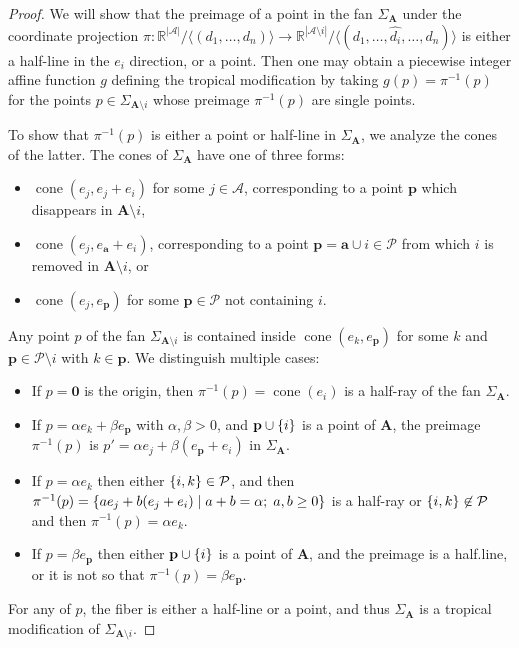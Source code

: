 \documentclass[10pt,a4paper]{amsart}
\newcommand{\R}{\mathbb{R}}    %
\newcommand{\arroid}{\mathbf{A}}
\newcommand{\arroidDeletion}[1]{\arroid\setminus #1}
\DeclareMathOperator{\cone}{cone}
\newcommand{\groundset}{\mathcal{A}}
\newcommand{\pbf}{\mathbf{p}}
\newcommand{\points}{\mathcal{P}}
\DeclarePairedDelimiter{\set}{\lbrace}{\rbrace}        %
\begin{document}
\begin{proof}
    We will show that the preimage of a point in the fan $\Sigma_{\arroid}$ under the coordinate projection $\pi \colon \R^{|\groundset|}/\langle(d_1,\dots, d_n)\rangle \to \R^{|\groundset\setminus i|}/\langle(d_1,\dots, \hat{d_i} ,\dots ,d_n) \rangle$ is either a half-line in the $e_i$ direction, or a point. Then one may obtain a piecewise integer affine function $g$ defining the tropical modification by taking $g(p) = \pi^{-1}(p)$ for the points $p\in \Sigma_{\arroidDeletion{i}}$ whose preimage $\pi^{-1}(p)$ are single points. 

    To show that $\pi^{-1}(p)$ is either a point or half-line in $\Sigma_{\arroid}$, we analyze the cones of the latter. The cones of $\Sigma_{\arroid}$ have one of three forms: 
    \begin{itemize}
        \item $\cone(e_j, e_j+e_i)$ for some $j\in \groundset$, corresponding to a point $\pbf$ which disappears in $\arroidDeletion{i}$,
        \item $\cone(e_j, e_\mathbf{a} + e_i)$, corresponding to a point $\pbf = \mathbf{a}\cup {i} \in \points$ from which $i$ is removed in $\arroidDeletion{i}$, or 
        \item $\cone(e_j, e_\pbf)$ for some $\pbf\in \points$ not containing $i$.
    \end{itemize}

    Any point $p$ of the fan $\Sigma_{\arroidDeletion{i}}$ is contained inside $\cone(e_k,e_\pbf)$ for some $k$ and $\pbf\in \points \setminus i$ with $k \in \pbf$. We distinguish multiple cases:
    \begin{itemize}
        \item If $p=\mathbf{0}$ is the origin, then $\pi^{-1}(p)=\cone(e_i)$ is a half-ray of the fan $\Sigma_{\arroid}$.
        \item If $p = \alpha e_k + \beta e_\pbf$ with $\alpha,\beta >0$, and $\pbf \cup \set{i}$ is a point of $\arroid$, the preimage $\pi^{-1}(p)$ is $p' = \alpha e_j + \beta (e_\pbf+ e_i)$ in $\Sigma_{\arroid}$.
        \item If $p= \alpha e_k$ then either $\set{i,k}\in \points$, and then $\pi^{-1}(p)= \set{a e_j +b (e_j+e_i) \mid a+b=\alpha; \; a,b \geq 0}$ is a half-ray or $\set{i,k} \not\in \points$ and then $\pi^{-1}(p)=\alpha e_k$.
        \item If $p = \beta e_\pbf$ then either $\pbf\cup \set{i}$ is a point of $\arroid$, and the preimage is a half.line, or it is not so that $\pi^{-1}(p)=\beta e_\pbf$.
    \end{itemize}
    For any of $p$, the fiber is either a half-line or a point, and thus $\Sigma_{\arroid}$ is a tropical modification of $\Sigma_{\arroid \setminus i}$.
    

\end{proof}
\end{document}
